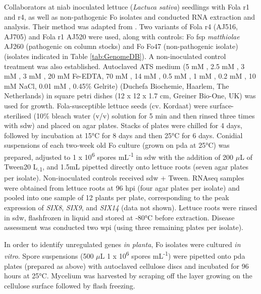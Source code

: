 Collaborators at \ac{niab} inoculated lettuce (\textit{Lactuca sativa}) seedlings with \ac{Fola} \ac{r1} and \ac{r4}, as well as non-pathogenic \ac{Fo} isolates and conducted RNA extraction and analysis. Their method was adapted from \textcite{Taylor2016}. Two variants of \ac{Fola} \ac{r4} (AJ516, AJ705) and \ac{Fola} \ac{r1} AJ520 were used, along with controls: \ac{Fo} \ac{fsp} \textit{matthiolae} AJ260 (pathogenic on column stocks) and \ac{Fo} Fo47 (non-pathogenic isolate) (isolates indicated in Table \ref{tab:GenomeDB}). A non-inoculated control treatment was also established. Autoclaved ATS medium (5 mM , 2.5 mM , 3 mM , 3 mM , 20 mM Fe-EDTA, 70 mM , 14 mM , 0.5 mM , 1 mM , 0.2 mM , 10 mM NaCl, 0.01 mM , 0.45\% Gelrite) (Duchefa Biochemie, Haarlem, The Netherlands) in square petri dishes (12 x 12 x 1.7 cm, Greiner Bio-One, UK) was used for growth. \ac{Fola}-susceptible lettuce seeds (cv. Kordaat) were surface-sterilised (10\% bleach water (v/v) solution for 5 min and then rinsed three times with \ac{sdw}) and placed on agar plates. Stacks of plates were chilled for 4 days, followed by incubation at 15°C for 8 days and then 25°C for 6 days. Conidial suspensions of each two-week old \ac{Fo} culture (grown on \ac{pda} at 25°C) was prepared, adjusted to 1 x 10\textsuperscript{6} spores mL\textsuperscript{-1} in \ac{sdw} with the addition of 200 \(\mu\)L of Tween20 L\textsubscript{-1}, and 1.5mL pipetted directly onto lettuce roots (seven agar plates per isolate). Non-inoculated controls received \ac{sdw} + Tween. RNAseq samples were obtained from lettuce roots at 96 \ac{hpi} (four agar plates per isolate) and pooled into one sample of 12 plants per plate, corresponding to the peak expression of \textit{SIX8}, \textit{SIX9}, and \textit{SIX14} (data not shown). Lettuce roots were rinsed in \ac{sdw}, flashfrozen in liquid  and stored at -80°C before extraction. Disease assessment was conducted two \ac{wpi} (using three remaining plates per isolate).

In order to identify unregulated genes \textit{in planta}, \ac{Fo} isolates were cultured \textit{in vitro}. Spore suspensions (500 \(\mu\)L 1 x 10\textsuperscript{6} spores mL\textsuperscript{-1}) were pipetted onto \ac{pda} plates (prepared as above) with autoclaved cellulose discs and incubated for 96 hours at 25°C. Mycelium was harvested by scraping off the layer growing on the cellulose surface followed by flash freezing. 

